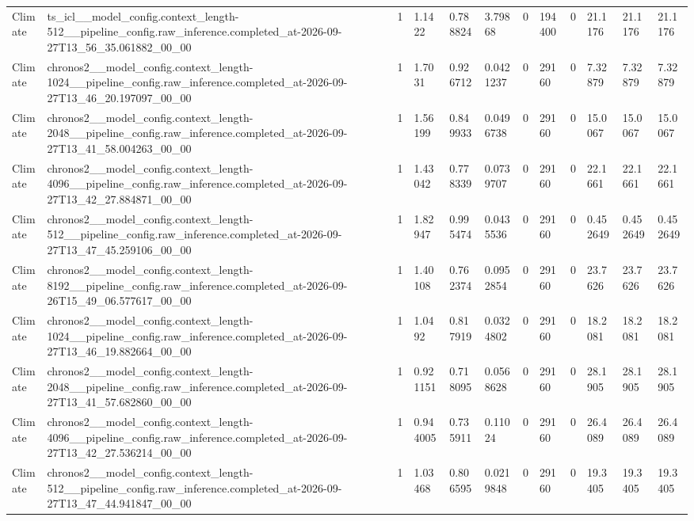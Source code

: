 \begin{tabular}{llllllllllll}
Climate & ts\_icl\_\_model\_config.context\_length-512\_\_pipeline\_config.raw\_inference.completed\_at-2026-09-27T13\_56\_35.061882\_00\_00 & 1 & 1.1422 & 0.788824 & 3.79868 & 0 & 194400 & 0 & 21.1176 & 21.1176 & 21.1176 \\
Climate & chronos2\_\_model\_config.context\_length-1024\_\_pipeline\_config.raw\_inference.completed\_at-2026-09-27T13\_46\_20.197097\_00\_00 & 1 & 1.7031 & 0.926712 & 0.0421237 & 0 & 29160 & 0 & 7.32879 & 7.32879 & 7.32879 \\
Climate & chronos2\_\_model\_config.context\_length-2048\_\_pipeline\_config.raw\_inference.completed\_at-2026-09-27T13\_41\_58.004263\_00\_00 & 1 & 1.56199 & 0.849933 & 0.0496738 & 0 & 29160 & 0 & 15.0067 & 15.0067 & 15.0067 \\
Climate & chronos2\_\_model\_config.context\_length-4096\_\_pipeline\_config.raw\_inference.completed\_at-2026-09-27T13\_42\_27.884871\_00\_00 & 1 & 1.43042 & 0.778339 & 0.0739707 & 0 & 29160 & 0 & 22.1661 & 22.1661 & 22.1661 \\
Climate & chronos2\_\_model\_config.context\_length-512\_\_pipeline\_config.raw\_inference.completed\_at-2026-09-27T13\_47\_45.259106\_00\_00 & 1 & 1.82947 & 0.995474 & 0.0435536 & 0 & 29160 & 0 & 0.452649 & 0.452649 & 0.452649 \\
Climate & chronos2\_\_model\_config.context\_length-8192\_\_pipeline\_config.raw\_inference.completed\_at-2026-09-26T15\_49\_06.577617\_00\_00 & 1 & 1.40108 & 0.762374 & 0.0952854 & 0 & 29160 & 0 & 23.7626 & 23.7626 & 23.7626 \\
Climate & chronos2\_\_model\_config.context\_length-1024\_\_pipeline\_config.raw\_inference.completed\_at-2026-09-27T13\_46\_19.882664\_00\_00 & 1 & 1.0492 & 0.817919 & 0.0324802 & 0 & 29160 & 0 & 18.2081 & 18.2081 & 18.2081 \\
Climate & chronos2\_\_model\_config.context\_length-2048\_\_pipeline\_config.raw\_inference.completed\_at-2026-09-27T13\_41\_57.682860\_00\_00 & 1 & 0.921151 & 0.718095 & 0.0568628 & 0 & 29160 & 0 & 28.1905 & 28.1905 & 28.1905 \\
Climate & chronos2\_\_model\_config.context\_length-4096\_\_pipeline\_config.raw\_inference.completed\_at-2026-09-27T13\_42\_27.536214\_00\_00 & 1 & 0.944005 & 0.735911 & 0.11024 & 0 & 29160 & 0 & 26.4089 & 26.4089 & 26.4089 \\
Climate & chronos2\_\_model\_config.context\_length-512\_\_pipeline\_config.raw\_inference.completed\_at-2026-09-27T13\_47\_44.941847\_00\_00 & 1 & 1.03468 & 0.806595 & 0.0219848 & 0 & 29160 & 0 & 19.3405 & 19.3405 & 19.3405 \\

\end{tabular}
